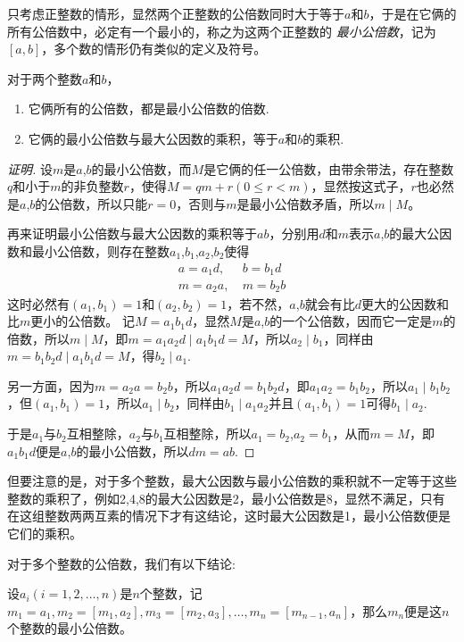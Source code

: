 只考虑正整数的情形，显然两个正整数的公倍数同时大于等于$a$和$b$，于是在它俩的所有公倍数中，必定有一个最小的，称之为这两个正整数的 \emph{最小公倍数}，记为$[a,b]$，多个数的情形仍有类似的定义及符号。

\begin{theorem}
  对于两个整数$a$和$b$，
  \begin{enumerate}
  \item 它俩所有的公倍数，都是最小公倍数的倍数.
  \item 它俩的最小公倍数与最大公因数的乘积，等于$a$和$b$的乘积.
  \end{enumerate}
\end{theorem}

\begin{proof}[证明]
  设$m$是$a$,$b$的最小公倍数，而$M$是它俩的任一公倍数，由带余带法，存在整数$q$和小于$m$的非负整数$r$，使得$M=qm+r(0 \leqslant r <m)$，显然按这式子，$r$也必然是$a$,$b$的公倍数，所以只能$r=0$，否则与$m$是最小公倍数矛盾，所以$m\mid M$。

  再来证明最小公倍数与最大公因数的乘积等于$ab$，分别用$d$和$m$表示$a$,$b$的最大公因数和最小公倍数，则存在整数$a_1$,$b_1$,$a_2$,$b_2$使得
  \begin{align*}
    a = a_1d, & \  b = b_1d \\
    m = a_2a, & \  m = b_2b
  \end{align*}
  这时必然有$(a_1,b_1)=1$和$(a_2,b_2)=1$，若不然，$a$,$b$就会有比$d$更大的公因数和比$m$更小的公倍数。
  记$M=a_1b_1d$，显然$M$是$a$,$b$的一个公倍数，因而它一定是$m$的倍数，所以$m \mid M$，即$m=a_1a_2d \mid a_1b_1d = M$，所以$a_2 \mid b_1$，同样由$m=b_1b_2d \mid a_1b_1d = M$，得$b_2 \mid a_1$.

  另一方面，因为$m=a_2a=b_2b$，所以$a_1a_2d=b_1b_2d$，即$a_1a_2=b_1b_2$，所以$a_1 \mid b_1b_2$，但$(a_1,b_1)=1$，所以$a_1 \mid b_2$，同样由$b_1 \mid a_1a_2$并且$(a_1,b_1)=1$可得$b_1 \mid a_2$.

  于是$a_1$与$b_2$互相整除，$a_2$与$b_1$互相整除，所以$a_1=b_2$,$a_2=b_1$，从而$m=M$，即$a_1b_1d$便是$a$,$b$的最小公倍数，所以$dm=ab$.
\end{proof}

但要注意的是，对于多个整数，最大公因数与最小公倍数的乘积就不一定等于这些整数的乘积了，例如2,4,8的最大公因数是2，最小公倍数是8，显然不满足，只有在这组整数两两互素的情况下才有这结论，这时最大公因数是1，最小公倍数便是它们的乘积。

对于多个整数的公倍数，我们有以下结论:
\begin{theorem}
  设$a_i(i=1,2,\ldots,n)$是$n$个整数，记$m_1=a_1, m_2=[m_1,a_2], m_3=[m_2,a_3],\ldots,m_n=[m_{n-1},a_n]$，那么$m_n$便是这$n$个整数的最小公倍数。
\end{theorem}

